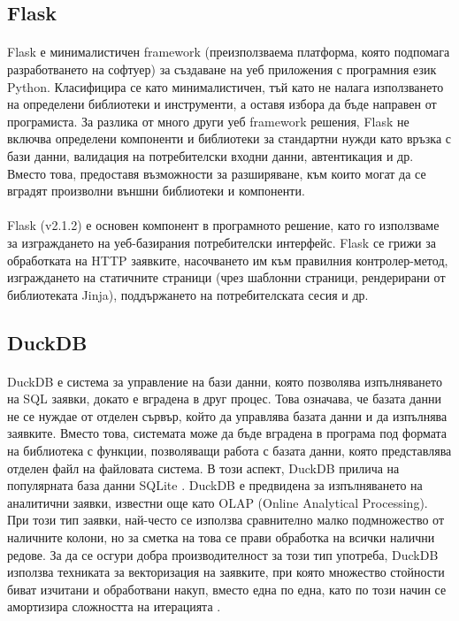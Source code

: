 \documentclass[pdftex,cyrillic,14pt,a4page,twoside,openright]{extreport}
\begin{document}
\subsection{Flask}
\paragraph{}
Flask \cite{flask} е минималистичен framework (преизползваема платформа, която подпомага разработването на софтуер) за създаване на уеб приложения с програмния език Python. Класифицира се като минималистичен, тъй като не налага използването на определени библиотеки и инструменти, а оставя избора да бъде направен от програмиста. За разлика от много други уеб framework решения, Flask не включва определени компоненти и библиотеки за стандартни нужди като връзка с бази данни, валидация на потребителски входни данни, автентикация и др. Вместо това, предоставя възможности за разширяване, към които могат да се вградят произволни външни библиотеки и компоненти.

\paragraph{}
Flask (v2.1.2) е основен компонент в програмното решение, като го използваме за изграждането на уеб-базирания потребителски интерфейс. Flask се грижи за обработката на HTTP заявките, насочването им към правилния контролер-метод, изграждането на статичните страници (чрез шаблонни страници, рендерирани от библиотеката Jinja), поддържането на потребителската сесия и др.

\subsection{DuckDB}\label{sec:duckdb}
\paragraph{}
DuckDB \cite{raasveldt2019} е система за управление на бази данни, която позволява изпълняването на SQL заявки, докато е вградена в друг процес. Това означава, че базата данни не се нуждае от отделен сървър, който да управлява базата данни и да изпълнява заявките. Вместо това, системата може да бъде вградена в програма под формата на библиотека с функции, позволяващи работа с базата данни, която представлява отделен файл на файловата система. В този аспект, DuckDB прилича на популярната база данни SQLite \cite{sqlite2020hipp}. DuckDB е предвидена за изпълняването на аналитични заявки, известни още като OLAP (Online Analytical Processing). При този тип заявки, най-често се използва сравнително малко подмножество от наличните колони, но за сметка на това се прави обработка на всички налични редове. За да се осгури добра производителност за този тип употреба, DuckDB използва техниката за векторизация на заявките, при която множество стойности биват изчитани и обработвани накуп, вместо една по една, като по този начин се амортизира сложността на итерацията \cite{kersten2018}.
\end{document}
